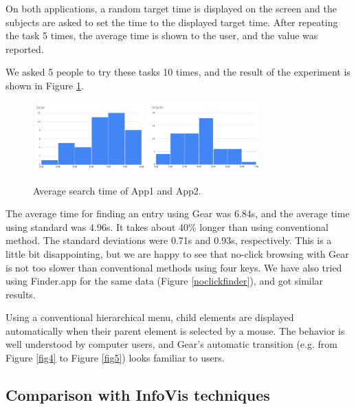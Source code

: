 \documentclass[conference]{IEEEtran}
\begin{document}
On both applications, a random target time is displayed on the screen and the subjects are
asked to set the time to the displayed target time.
After repeating the task 5 times, the average time is shown to the user, and the value
was reported.

We asked 5 people to try these tasks 10 times, and the result of the experiment is
shown in Figure \ref{monorailtime}.

\begin{figure}[H]
\centerline{
  \includegraphics[width=43mm,bb=0 0 960 593]{figures/6c39f199b341e30ffc28850afbd90a5a.png}
  \includegraphics[width=43mm,bb=0 0 960 593]{figures/de3f0545e0d0d8dfb9708d2420fb5407.png}
}
\caption{Average search time of App1 and App2.}
\label{monorailtime}
\end{figure}

The average time for finding an entry using Gear was 6.84s,
and the average time using standard  was 4.96s.
It takes about 40\% longer than using conventional method.
The standard deviations were 0.71s and 0.93s, respectively.
%
This is a little bit disappointing,
but we are happy to see that
no-click browsing with Gear is not too slower than
conventional methods using four keys.
%
We have also tried using Finder.app for the same data (Figure \ref{noclickfinder}), and
got similar results.

Using a conventional hierarchical menu,
child elements are displayed automatically when their parent element is selected by a mouse.
The behavior is well understood by computer users,
and Gear's automatic transition (e.g. from Figure \ref{fig4} to Figure \ref{fig5})
looks familiar to users.

\subsection{Comparison with InfoVis techniques}
\end{document}
